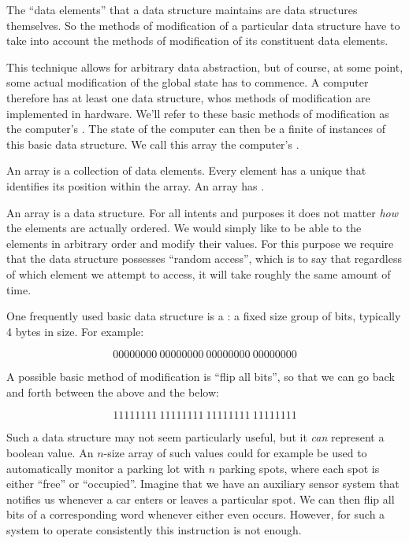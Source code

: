 The ``data elements'' that a data structure maintains are data structures
themselves. So the methods of modification of a particular data structure have
to take into account the methods of modification of its constituent data
elements.

This technique allows for arbitrary data abstraction, but of course, at some
point, some actual modification of the global state has to commence. A computer
therefore has  at least one  data structure, whos methods of
modification are implemented in hardware. We'll refer to these basic methods of
modification as the computer's . The state of the computer
can then be a finite  of instances of this basic data structure. We
call this array the computer's .

\begin{definition}

An array is a collection of data elements. Every element has a unique
 that identifies its position within the array. An array has
.

\end{definition}

An array is a data structure. For all intents and purposes it does not matter
\emph{how} the elements are actually ordered. We would simply like to be able
to  the elements in arbitrary order and modify their values. For
this purpose we require that the data structure possesses ``random access'',
which is to say that regardless of which element we attempt to access, it will
take roughly the same amount of time.

One frequently used basic data structure is a : a fixed size group of
bits, typically 4 bytes in size. For example:

\begin{equation}
0000 0000\ 0000 0000\ 0000 0000\ 0000 0000 \label{word-0}
\end{equation}

A possible basic method of modification is ``flip all bits'', so that we can go
back and forth between the above and the below:

\begin{equation}
1111 1111\ 1111 1111\ 1111 1111\ 1111 1111 \label{word-1}
\end{equation}

Such a data structure may not seem particularly useful, but it \emph{can}
represent a boolean value. An $n$-size array of such values could for example
be used to automatically monitor a parking lot with $n$ parking spots, where
each spot is either ``free'' or ``occupied''. Imagine that we have an auxiliary
sensor system that notifies us whenever a car enters or leaves a particular
spot. We can then flip all bits of a corresponding word whenever either even
occurs. However, for such a system to operate consistently this instruction is
not enough.

